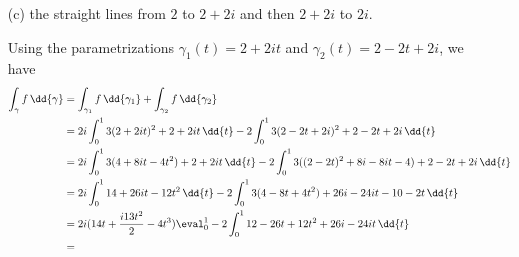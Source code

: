 \documentclass{article}
\begin{document}
\begin{itemize}
        \item [(c)] the straight lines from $2$ to $2 + 2i$ and then $2 + 2i$ to $2i$.
            \begin{answer}
                Using the parametrizations $\gamma_{1}(t) = 2 + 2it$ and $\gamma_{2}(t) = 2 - 2t + 2i$, we have
                    \begin{align*}
                        \int_{\gamma}^{} f \, \dd{\gamma}  &= \int_{\gamma_{1}}^{} f \, \dd{\gamma_{1}} + \int_{\gamma_{2}}^{} f \, \dd{\gamma_{2}}                                          \\
                                                           &= 2i\int_{0}^{1} 3(2 + 2it)^{2} + 2 + 2it \, \dd{t}  - 2\int_{0}^{1} 3(2 - 2t + 2i)^{2} + 2 - 2t + 2i \, \dd{t}                  \\
                                                           &= 2i\int_{0}^{1} 3(4 + 8it - 4t^{2}) + 2 + 2it \, \dd{t} -2 \int_{0}^{1} 3((2 - 2t)^{2} + 8i - 8it - 4) + 2 - 2t + 2i \, \dd{t}  \\
                                                           &= 2i\int_{0}^{1} 14 + 26it - 12t^{2} \, \dd{t} -  2 \int_{0}^{1} 3(4 - 8t + 4t^{2}) + 26i - 24it - 10 - 2t \, \dd{t}             \\
                                                           &= 2i(14t + \dfrac{i13t^{2}}{2} - 4t^{3})\eval_{0}^{1} - 2 \int_{0}^{1} 12 -26t + 12t^{2} + 26i - 24it \, \dd{t}                  \\
                                                           &=                                                                                                                                \\
                                                           &                                                                                                                                   
                    \end{align*}
            \end{answer}
    \end{itemize}

\newpage
\end{document}
